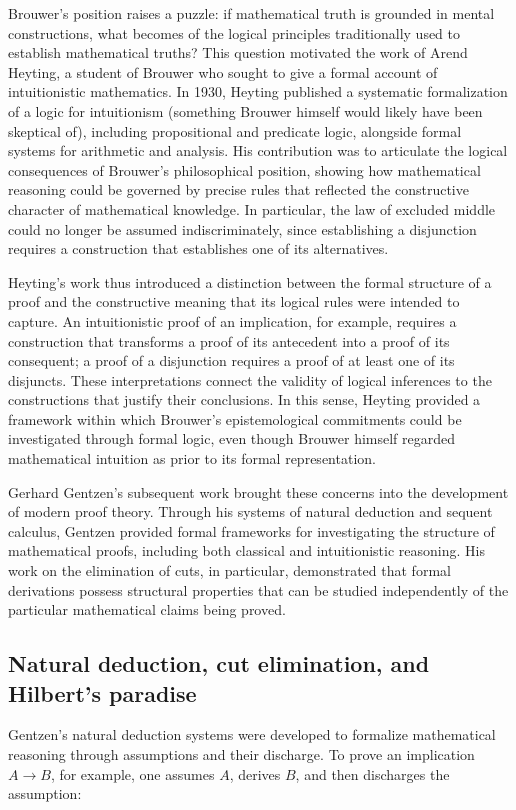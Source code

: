 \documentclass{article}
\begin{document}
Brouwer's position raises a puzzle: if mathematical truth is grounded in mental constructions, what 
becomes of the logical principles traditionally used to establish mathematical truths? This question motivated the work 
of Arend Heyting, a student of Brouwer who sought to give a formal account of intuitionistic mathematics. In 1930, 
Heyting \textit{\parencite{heyting1930a,heyting1930b,heyting1930c}} published a systematic formalization of a logic for intuitionism (something Brouwer himself would likely have been 
skeptical of), including propositional and predicate logic, alongside formal systems for arithmetic and analysis. His 
contribution was to articulate the logical consequences of Brouwer’s philosophical position, showing how mathematical 
reasoning could be governed by precise rules that reflected the constructive character of mathematical knowledge. 
In particular, the law of excluded middle could no longer be assumed indiscriminately, since establishing a 
disjunction requires a construction that establishes one of its alternatives. 

Heyting's work thus introduced a distinction between the formal structure of a proof and the constructive meaning that its 
logical rules were intended to capture. An intuitionistic proof of an implication, for example, requires a construction 
that transforms a proof of its antecedent into a proof of its consequent; a proof of a disjunction requires a proof of at 
least one of its disjuncts. These interpretations connect the validity of logical inferences to the constructions that 
justify their conclusions. In this sense, Heyting provided a framework within which Brouwer's epistemological commitments 
could be investigated through formal logic, even though Brouwer himself regarded mathematical intuition as prior to its 
formal representation. 

Gerhard Gentzen's \textit{\parencite{gentzen1935a,gentzen1935b}} subsequent work brought these concerns into the development of modern proof theory. Through his 
systems of natural deduction and sequent calculus, Gentzen provided formal frameworks for investigating the structure of 
mathematical proofs, including both classical and intuitionistic reasoning. His work on the elimination of cuts, 
in particular, demonstrated that formal derivations possess structural properties that can be studied independently 
of the particular mathematical claims being proved. 
\subsection{Natural deduction, cut elimination, and Hilbert's paradise}
Gentzen's natural deduction systems were developed to formalize mathematical reasoning through assumptions and their 
discharge. To prove an implication $A\to B$, for example, one assumes $A$, derives $B$, and then discharges the assumption:
\end{document}
